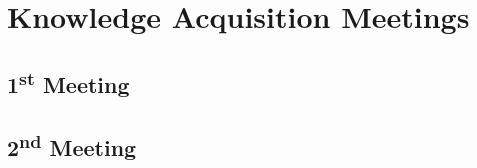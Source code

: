 \section{Knowledge Acquisition Meetings}

\subsection{1\textsuperscript{st} Meeting}

\subsection{2\textsuperscript{nd} Meeting}